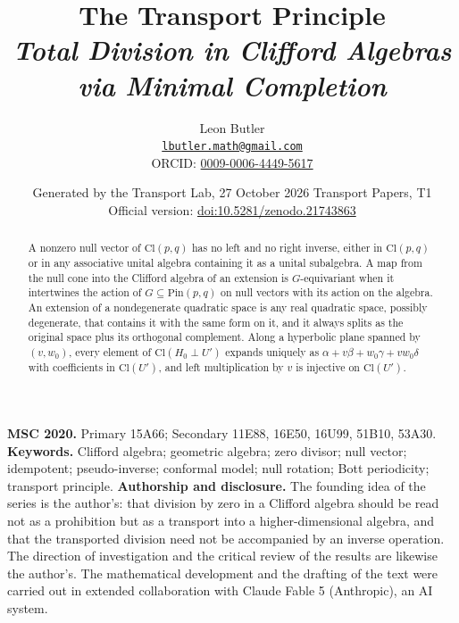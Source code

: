 \documentclass[11pt]{article}
\title{\bfseries The Transport Principle\\[4pt]\large\itshape Total Division in Clifford Algebras via Minimal Completion}
\author{Leon Butler\\ \normalsize\href{mailto:lbutler.math@gmail.com}{\texttt{lbutler.math@gmail.com}}\\ \normalsize ORCID: \href{https://orcid.org/0009-0006-4449-5617}{0009-0006-4449-5617}}
\date{Generated by the Transport Lab, 27 October 2026 \textperiodcentered{} Transport Papers, T1\\[3pt]\small Official version: \href{https://doi.org/10.5281/zenodo.21743863}{doi:10.5281/zenodo.21743863}}
\theoremstyle{definition}
\theoremstyle{plain}
\providecommand{\Cl}{}\renewcommand{\Cl}{\mathrm{Cl}}
\providecommand{\Pin}{}\renewcommand{\Pin}{\mathrm{Pin}}
\begin{document}
\maketitle
\begin{abstract}
\normalsize
A nonzero null vector of $\Cl(p,q)$ has no left and no right inverse, either in $\Cl(p,q)$ or in any associative unital algebra containing it as a unital subalgebra. A map from the null cone into the Clifford algebra of an extension is $G$-equivariant when it intertwines the action of $G \subseteq \Pin(p,q)$ on null vectors with its action on the algebra. An extension of a nondegenerate quadratic space is any real quadratic space, possibly degenerate, that contains it with the same form on it, and it always splits as the original space plus its orthogonal complement. Along a hyperbolic plane spanned by $(v, w_0)$, every element of $\Cl(H_0 \perp U')$ expands uniquely as $\alpha + v\beta + w_0\gamma + v w_0\delta$ with coefficients in $\Cl(U')$, and left multiplication by $v$ is injective on $\Cl(U')$.
\end{abstract}
\medskip
\noindent\textbf{MSC 2020.} Primary 15A66; Secondary 11E88, 16E50, 16U99, 51B10, 53A30.\\
\textbf{Keywords.} Clifford algebra; geometric algebra; zero divisor; null vector; idempotent; pseudo-inverse; conformal model; null rotation; Bott periodicity; transport principle.
\newpage
\noindent \textbf{Authorship and disclosure. }The founding idea of the series is the author's: that division by zero in a Clifford algebra should be read not as a prohibition but as a transport into a higher-dimensional algebra, and that the transported division need not be accompanied by an inverse operation. The direction of investigation and the critical review of the results are likewise the author's. The mathematical development and the drafting of the text were carried out in extended collaboration with Claude Fable 5 (Anthropic), an AI system.

\noindent{}
\newpage
\end{document}

